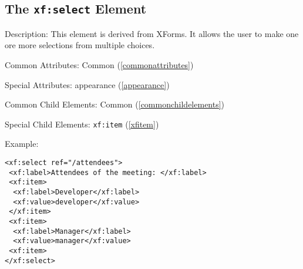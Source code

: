 \subsection{ The \texttt{xf:select} Element}
\label{xfselect}
\begin{description}
 \item Description: This element is derived from XForms. It allows the user to make one ore more selections from multiple choices.

 \item Common Attributes: Common (\ref{commonattributes})

 \item Special Attributes: appearance (\ref{appearance})

 \item Common Child Elements: Common (\ref{commonchildelements})

 \item Special Child Elements: \texttt{xf:item} (\ref{xfitem})

 \item Example: 

\begin{lstlisting}[caption=\texttt{section} Element]
<xf:select ref="/attendees">
 <xf:label>Attendees of the meeting: </xf:label>
 <xf:item>
  <xf:label>Developer</xf:label>
  <xf:value>developer</xf:value>
 </xf:item>
 <xf:item>
  <xf:label>Manager</xf:label>
  <xf:value>manager</xf:value>
 <xf:item>
</xf:select>
\end{lstlisting}
\end{description}


